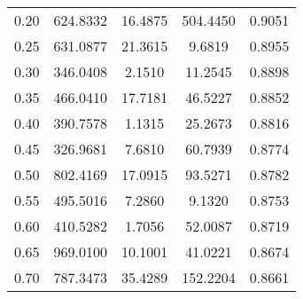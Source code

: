 \documentclass[
    a4paper, aps, twocolumn, floatfix, superscriptaddress,
    nofootinbib]{revtex4-1}
\begin{document}
\begin{table}[H]
{\begin{ruledtabular}
\begin{tabular}{ccccc}
0.20     & 624.8332 & 16.4875  & 504.4450   & 0.9051      \\
0.25     & 631.0877 & 21.3615  & 9.6819     & 0.8955      \\
0.30     & 346.0408 & 2.1510   & 11.2545    & 0.8898      \\
0.35     & 466.0410 & 17.7181  & 46.5227    & 0.8852      \\
0.40     & 390.7578 & 1.1315   & 25.2673    & 0.8816      \\
0.45     & 326.9681 & 7.6810   & 60.7939    & 0.8774      \\
0.50     & 802.4169 & 17.0915  & 93.5271    & 0.8782      \\
0.55     & 495.5016 & 7.2860   & 9.1320     & 0.8753      \\
0.60     & 410.5282 & 1.7056   & 52.0087    & 0.8719      \\
0.65     & 969.0100 & 10.1001  & 41.0221    & 0.8674      \\
0.70     & 787.3473 & 35.4289  & 152.2204   & 0.8661    \\
\end{tabular}
\end{ruledtabular}
}
\end{table}

\end{document}
